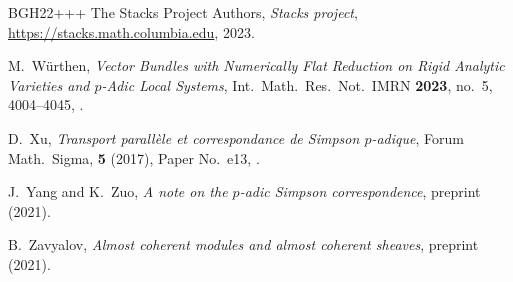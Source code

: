 \documentclass[11pt]{amsart}
\numberwithin{equation}{section}
\theoremstyle{definition}
\theoremstyle{remark}
\begin{document}
\begin{thebibliography}{BGH{\etalchar{+}}22+++}
The Stacks Project Authors, \emph{Stacks project}, \url{https://stacks.math.columbia.edu}, 2023. 
	
M.~W\"{u}rthen, 
{\em {V}ector {B}undles with {N}umerically {F}lat {R}eduction on {R}igid {A}nalytic {V}arieties and $p$-{A}dic {L}ocal {S}ystems}, Int.\ Math.\ Res.\ Not.\  IMRN \textbf{2023}, no.~5, 4004--4045, .
	
D.~Xu, 
{\em Transport parall\`ele et correspondance de {S}impson {$p$}-adique}, Forum Math.\ Sigma,  \textbf{5} (2017), Paper No.~e13, .
	
J.~Yang and  K.~Zuo,
{\em A note on the $p$-adic {S}impson correspondence}, preprint  (2021).
	
B.~Zavyalov, 
{\em Almost coherent modules and almost coherent sheaves}, preprint  (2021).
	
\end{thebibliography}
\end{document}
